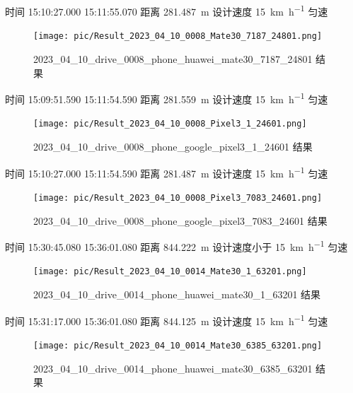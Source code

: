 \documentclass{beamer} %
\begin{document}
\begin{frame}
    时间 15:10:27.000  15:11:55.070 距离 \qty{281.487}{\meter}
    设计速度 \qty{15}{\km\per\hour} 匀速
    \begin{figure}[htbp]
        \centering
        \texttt{[image: pic/Result\_2023\_04\_10\_0008\_Mate30\_7187\_24801.png]}
        \caption{2023\_04\_10\_drive\_0008\_phone\_huawei\_mate30\_7187\_24801 结果}
        \label{fig:transformer-arc}
    \end{figure}
\end{frame}

\begin{frame}
    时间 15:09:51.590  15:11:54.590 距离 \qty{281.559}{\meter}
    设计速度 \qty{15}{\km\per\hour} 匀速
    \begin{figure}[htbp]
        \centering
        \texttt{[image: pic/Result\_2023\_04\_10\_0008\_Pixel3\_1\_24601.png]}
        \caption{2023\_04\_10\_drive\_0008\_phone\_google\_pixel3\_1\_24601 结果}
        \label{fig:transformer-arc}
    \end{figure}
\end{frame}

\begin{frame}
    时间 15:10:27.000  15:11:54.590 距离 \qty{281.487}{\meter}
    设计速度 \qty{15}{\km\per\hour} 匀速
    \begin{figure}[htbp]
        \centering
        \texttt{[image: pic/Result\_2023\_04\_10\_0008\_Pixel3\_7083\_24601.png]}
        \caption{2023\_04\_10\_drive\_0008\_phone\_google\_pixel3\_7083\_24601 结果}
        \label{fig:transformer-arc}
    \end{figure}
\end{frame}



\begin{frame}
    时间 15:30:45.080  15:36:01.080 距离 \qty{844.222}{\meter}
    设计速度小于 \qty{15}{\km\per\hour} 匀速
    \begin{figure}[htbp]
        \centering
        \texttt{[image: pic/Result\_2023\_04\_10\_0014\_Mate30\_1\_63201.png]}
        \caption{2023\_04\_10\_drive\_0014\_phone\_huawei\_mate30\_1\_63201 结果}
        \label{fig:transformer-arc}
    \end{figure}
\end{frame}

\begin{frame}
    时间 15:31:17.000  15:36:01.080 距离 \qty{844.125}{\meter}
    设计速度 \qty{15}{\km\per\hour} 匀速
    \begin{figure}[htbp]
        \centering
        \texttt{[image: pic/Result\_2023\_04\_10\_0014\_Mate30\_6385\_63201.png]}
        \caption{2023\_04\_10\_drive\_0014\_phone\_huawei\_mate30\_6385\_63201 结果}
        \label{fig:transformer-arc}
    \end{figure}
\end{frame}
\end{document}
